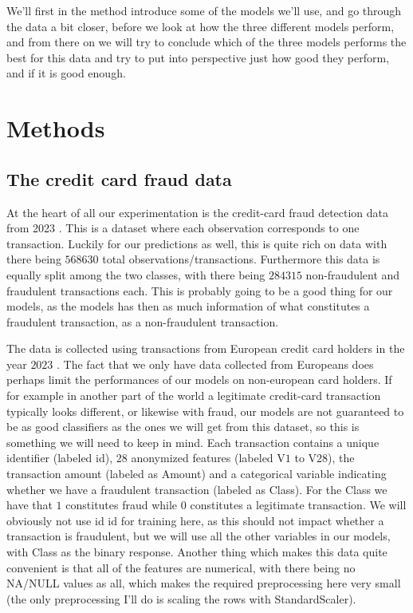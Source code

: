 \documentclass{article}
\begin{document}
We'll first in the method introduce some of the models we'll use, and go
through the data a bit closer, before we look at how the three different models
perform, and from there on we will try to conclude which of the three models
performs the best for this data and try to put into perspective just how good
they perform, and if it is good enough.

\section{Methods}
\subsection{The credit card fraud data}
At the heart of all our experimentation is the credit-card fraud detection
data from 2023 \cite{kaggleccdata}. This is a dataset where each observation
corresponds to one transaction. Luckily for our predictions as well, this is
quite rich on data with there being $568630$ total observations/transactions.
Furthermore this data is equally split among the two classes, with there being
$284315$ non-fraudulent and fraudulent transactions each. This is probably
going to be a good thing for our models, as the models has then as much
information of what constitutes a fraudulent transaction, as a non-fraudulent
transaction.

The data is collected using transactions from European credit card holders in
the year $2023$ \cite{kaggleccdata}. The fact that we only have data collected
from Europeans does perhaps limit the performances of our models on
non-european card holders. If for example in another part of the world a
legitimate credit-card transaction typically looks different, or likewise with
fraud, our models are not guaranteed to be as good classifiers as the ones we
will get from this dataset, so this is something we will need to keep in mind.
Each transaction contains a unique identifier (labeled id), $28$ anonymized
features (labeled $\text{V}1$ to $\text{V}28$), the transaction amount (labeled
as Amount) and a categorical variable indicating whether we have a fraudulent
transaction (labeled as Class). For the Class we have that $1$ constitutes
fraud while $0$ constitutes a legitimate transaction. We will obviously not use
id id for training here, as this should not impact whether a transaction is
fraudulent, but we will use all the other variables in our models, with Class
as the binary response. Another thing which makes this data quite convenient is
that all of the features are numerical, with there being no NA/NULL values as
all, which makes the required preprocessing here very small (the only
preprocessing I'll do is scaling the rows with StandardScaler).
\\
\end{document}
